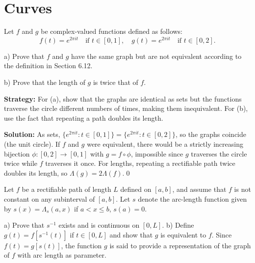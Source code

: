 \section{Curves}



\begin{problembox}
\begin{problemstatement}
Let $f$ and $g$ be complex-valued functions defined as follows:
\[f(t) = e^{2\pi it} \quad \text{if } t \in [0, 1], \quad g(t) = e^{2\pi it} \quad \text{if } t \in [0, 2].\]

a) Prove that $f$ and $g$ have the same graph but are not equivalent according to the definition in Section 6.12.

b) Prove that the length of $g$ is twice that of $f$.
\end{problemstatement}
\end{problembox}

\noindent\textbf{Strategy:} For (a), show that the graphs are identical as sets but the functions traverse the circle different numbers of times, making them inequivalent. For (b), use the fact that repeating a path doubles its length.

\bigskip\noindent\textbf{Solution:}
As sets, $\{e^{2\pi it}:t\in[0,1]\}=\{e^{2\pi it}:t\in[0,2]\}$, so the graphs coincide (the unit circle). If $f$ and $g$ were equivalent, there would be a strictly increasing bijection $\phi:[0,2]\to[0,1]$ with $g=f\circ\phi$, impossible since $g$ traverses the circle twice while $f$ traverses it once. For lengths, repeating a rectifiable path twice doubles its length, so $\Lambda(g)=2\Lambda(f)$.\qed


\begin{problembox}
\begin{problemstatement}
Let $f$ be a rectifiable path of length $L$ defined on $[a, b]$, and assume that $f$ is not constant on any subinterval of $[a, b]$. Let $s$ denote the arc-length function given by $s(x) = \Lambda_s(a, x)$ if $a < x \leq b$, $s(a) = 0$.

a) Prove that $s^{-1}$ exists and is continuous on $[0, L]$.
b) Define $g(t) = f[s^{-1}(t)]$ if $t \in [0, L]$ and show that $g$ is equivalent to $f$. Since $f(t) = g[s(t)]$, the function $g$ is said to provide a representation of the graph of $f$ with arc length as parameter.
\end{problemstatement}
\end{problembox}


